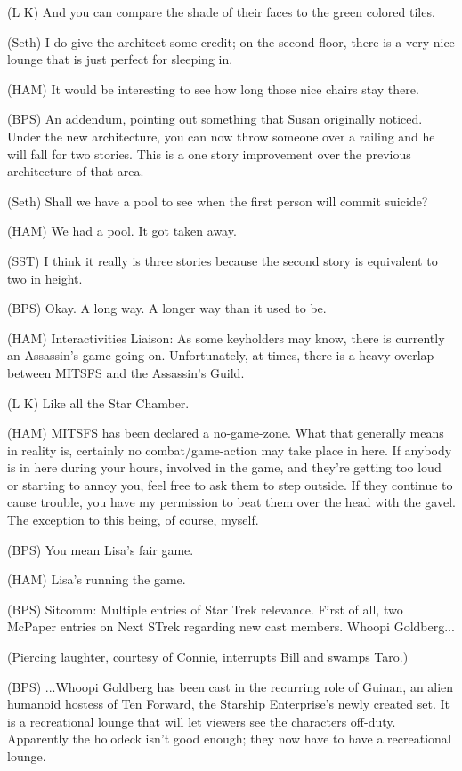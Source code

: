 \documentclass[12pt]{article}
\begin{document}
(L K) And you can compare the shade of their faces to the green colored tiles.

(Seth) I do give the architect some credit; on the second floor, there is a very nice lounge that is just perfect for sleeping in.

(HAM) It would be interesting to see how long those nice chairs stay there.

(BPS) An addendum, pointing out something that Susan originally noticed. Under the new architecture, you can now throw someone over a railing and he will fall for two stories. This is a one story improvement over the previous architecture of that area.

(Seth) Shall we have a pool to see when the first person will commit suicide?

(HAM) We had a pool. It got taken away.

(SST) I think it really is three stories because the second story is equivalent to two in height.

(BPS) Okay. A long way. A longer way than it used to be.

(HAM) Interactivities Liaison: As some keyholders may know, there is currently an Assassin's game going on. Unfortunately, at times, there is a heavy overlap between MITSFS and the Assassin's Guild.

(L K) Like all the Star Chamber.

(HAM) MITSFS has been declared a no-game-zone. What that generally means in reality is, certainly no combat/game-action may take place in here. If anybody is in here during your hours, involved in the game, and they're getting too loud or starting to annoy you, feel free to ask them to step outside. If they continue to cause trouble, you have my permission to beat them over the head with the gavel. The exception to this being, of course, myself.

(BPS) You mean Lisa's fair game.

(HAM) Lisa's running the game.

(BPS) Sitcomm: Multiple entries of Star Trek relevance. First of all, two McPaper entries on Next STrek regarding new cast members. Whoopi Goldberg...

(Piercing laughter, courtesy of Connie, interrupts Bill and swamps Taro.)

(BPS) ...Whoopi Goldberg has been cast in the recurring role of Guinan, an alien humanoid hostess of Ten Forward, the Starship Enterprise's newly created set. It is a recreational lounge that will let viewers see the characters off-duty. Apparently the holodeck isn't good enough; they now have to have a recreational lounge.
\end{document}
